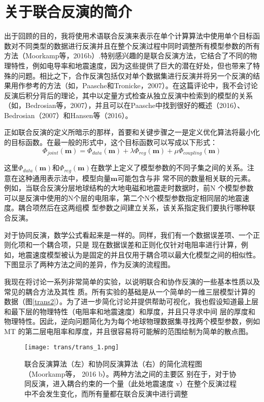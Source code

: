 \section{关于联合反演的简介}

出于回顾的目的，我将使用术语联合反演来表示在单个计算算法中使用单个目标函数对不同类型的数据进行反演并且在整个反演过程中同时调整所有模型参数的所有方法（Moorkamp等，2016b）.特别感兴趣的是联合反演方法，它结合了不同的物理特性，例如电导率和地震速度，因为这些提供了巨大的潜在好处，但也带来了特殊的问题。相比之下，合作反演包括仅对单个数据集进行反演并将另一个反演的结果用作参考的方法（如，Paasche和Tronicke，2007）。在这篇评论中，我不会讨论反演后积分背后的理论，其中以定量方式检查从独立反演中检索到的模型的关系（如，Bedrosian等，2007），并且可以在Paasche中找到很好的概述（2016）、Bedrosian（2007）和Hansen等（2016）。

正如联合反演的定义所暗示的那样，首要和关键步骤之一是定义优化算法将最小化的目标函数。在最一般的形式中，这个目标函数可以写成以下形式：
\begin{equation}
    \Phi_{joint}(\mathbf{m}) = \Phi_{data}(\mathbf{m}) +\lambda \Phi_{reg}(\mathbf{m})+\mu \Phi_{coupling}(\mathbf{m})
\end{equation}

这里$\Phi_{data}(\mathbf{m})$和$\Phi_{reg}(\mathbf{m})$在数学上定义了模型参数的不同子集之间的关系。注意在这种通用表示法中，模型向量$\mathbf{m}$可能包含与非 常不同的数量相关联的元素。例如，当联合反演分层地球结构的大地电磁和地震走时数据时，前N 个模型参数 可以是反演中使用的N个层的电阻率，第二个N个模型参数指定相同层的地震速度。耦合项然后在这两组模 型参数之间建立关系，该关系指定我们要执行哪种联合反演。

对于协同反演，数学公式看起来是一样的。同样，我们有一个数据误差项、一个正则化项和一个耦合项，只是 现在数据误差和正则化仅针对电阻率进行计算，例如，地震速度模型被认为是固定的并且仅用于耦合项以最大化模型之间的相似性。下图显示了两种方法之间的差异，作为反演的流程图。

我现在将讨论一系列非常简单的实验，以说明联合和协作反演的一些基本性质以及常见的耦合方法及其性 质。所有实验的基础是从一个简单的一维三层模型计算的数据（图\ref{trans2}）。为了进一步简化讨论并提供帮助可视化，我也假设知道最上层和最下层的物理特性（电阻率和地震速度）和厚度，并且只寻求中间 层的厚度和物理特性。因此，逆向问题简化为为每个地球物理数据集寻找两个模型参数，例如MT 的第二层电阻率和厚度，并且很容易将可能解的范围绘制为简单的散点图。

\begin{figure}
    \centering
    \texttt{[image: trans/trans\_1.png]}
    \caption[]{联合反演算法（左）和协同反演算法（右）的简化流程图（Moorkamp等， 2016 b）。两种方法之间的主要区 别在于，对于协同反演，进入耦合约束的一个量（此处地震速度 v）在整个反演过程中不会发生变化，而所有量都在联合反演中进行调整} \label{trans1}
\end{figure}

